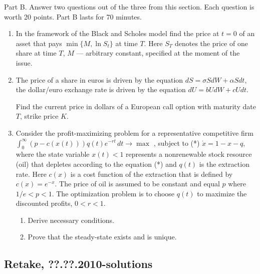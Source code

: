 \documentclass[12pt, a4paper]{article}
\begin{document}
Part B.
Answer two questions out of the three from this section. Each question is worth 20 points.
Part B lasts for 70 minutes.

\begin{enumerate}[resume]
\item In the framework of the Black and Scholes model find the price at $t=0$  of an asset that pays $\min\{M,\ln S_t\}$  at time $T$.
Here  $S_T$ denotes the price of one share at time $T$, $M$ — arbitrary constant, specified at the moment of the issue.

\item The price of a share in euros is driven by the equation $dS=\sigma S dW+\alpha S dt$, 
the dollar/euro exchange rate is driven by the equation $dU=b U dW+c U dt$. 

Find the current price in dollars of a European call option with maturity date $T$, strike price $K$.

\item Consider the profit-maximizing problem for a representative competitive firm
$\int_0^{\infty} (p-c(x(t)))q(t)e^{-rt}\,dt \to \max$
, subject to (*) $\dot{x}=1-x-q$, where the state variable $x(t)<1$ represents a nonrenewable stock resource (oil) that depletes according to the equation (*) and $q(t)$ is the extraction rate. Here $c(x)$ is a cost function of the extraction that is defined by $c(x)=e^{-x}$. The price of oil is assumed to be constant and equal $p$ where $1/e<p<1$.  The optimization problem is to choose $q(t)$ to maximize the discounted profits, $0<r<1$.
\begin{enumerate}
\item Derive necessary conditions.
\item Prove that the steady-state exists and is unique.
\end{enumerate}

\end{enumerate}

\subsection{Retake, ??.??.2010-solutions}
\end{document}
